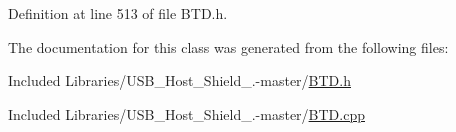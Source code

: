 \-Definition at line 513 of file \-B\-T\-D.\-h.



\-The documentation for this class was generated from the following files\-:\begin{DoxyCompactItemize}
\item 
\-Included Libraries/\-U\-S\-B\-\_\-\-Host\-\_\-\-Shield\-\_.-\/master/\hyperlink{_b_t_d_8h}{\-B\-T\-D.\-h}\item 
\-Included Libraries/\-U\-S\-B\-\_\-\-Host\-\_\-\-Shield\-\_.-\/master/\hyperlink{_b_t_d_8cpp}{\-B\-T\-D.\-cpp}\end{DoxyCompactItemize}
